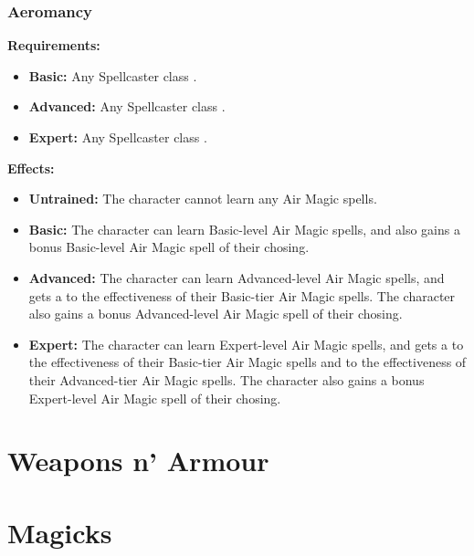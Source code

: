 \documentclass[openany,10pt,a4paper]{book}
\begin{document}
\subsection{Aeromancy}
\begin{table}[!ht]
\centering
{}
\end{table}
\textbf{Requirements:}
\begin{itemize}
	\item \textbf{Basic:} Any Spellcaster class .
	\item \textbf{Advanced:} Any Spellcaster class .
	\item \textbf{Expert:} Any Spellcaster class .
\end{itemize}
\textbf{Effects:}
\begin{itemize}
	\item \textbf{Untrained:} The character cannot learn any Air Magic spells.
	\item \textbf{Basic:} The character can learn Basic-level Air Magic spells, and also gains a bonus Basic-level Air Magic spell of their chosing.
	\item \textbf{Advanced:} The character can learn Advanced-level Air Magic spells, and gets a  to the effectiveness of their Basic-tier Air Magic spells. The character also gains a bonus Advanced-level Air Magic spell of their chosing.
	\item \textbf{Expert:} The character can learn Expert-level Air Magic spells, and gets a  to the effectiveness of their Basic-tier Air Magic spells and  to the effectiveness of their Advanced-tier Air Magic spells. The character also gains a bonus Expert-level Air Magic spell of their chosing.
\end{itemize}\newpage
\chapter{Weapons n' Armour}
\chapter{Magicks}
\end{document}
